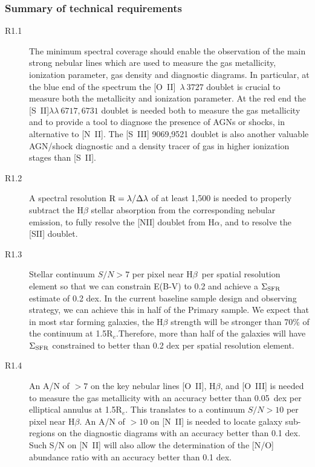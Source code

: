 \documentclass[preprint,11pt]{aastex}
\newcommand{\Hbeta}{{H$\beta$}}
\newcommand{\Reff}{{R$_{e}$}}
\begin{document}
\subsubsection{Summary of technical requirements}

\begin{description}

\item [R1.1] The minimum spectral coverage should enable the
  observation of the main strong nebular lines which are used to
  measure the gas metallicity, ionization parameter, gas density and
  diagnostic diagrams.  In particular, at the blue end of the spectrum
  the [O~II]~$\lambda~3727$ doublet is crucial to measure both the
  metallicity and ionization parameter.  At the red end the
  [S~II]$\lambda\lambda~6717,6731$ doublet is needed both to measure
  the gas metallicity and to provide a tool to diagnose the presence
  of AGNs or shocks, in alternative to [N~II]. The [S~III] 9069,9521
  doublet is also another valuable AGN/shock diagnostic
  \citep{osterbrock92} and a density tracer of gas in higher
  ionization stages than [S~II].

\item [R1.2] A spectral resolution $\rm R=\lambda/\Delta \lambda$ of
  at least 1,500 is needed to properly subtract the H$\beta$ stellar
  absorption from the corresponding nebular emission, to fully resolve
  the [NII] doublet from H$\alpha$, and to resolve the [SII] doublet.

\item [R1.3] Stellar continuum $S/N > 7$ per pixel near \Hbeta\ per
  spatial resolution element so that we can constrain E(B-V) to 0.2
  and achieve a ${\rm \Sigma_{SFR}}$ estimate of 0.2 dex. In the
  current baseline sample design and observing strategy, we can
  achieve this in half of the Primary sample. We expect that in most
  star forming galaxies, the H$\beta$ strength will be stronger than
  70\% of the continuum at 1.5\Reff.Therefore, more than half of the
  galaxies will have ${\rm \Sigma_{SFR}}$ constrained to better than
  0.2 dex per spatial resolution element.

\item [R1.4] An A/N of $>7$ on the key nebular lines [O~II], H$\beta$, and
  [O~III] is needed to measure the gas metallicity with an accuracy
  better than 0.05~dex per elliptical annulus at 1.5\Reff. This translates
  to a continuum $S/N > 10$ per pixel near \Hbeta.
  An A/N of $>10$ on [N~II] is needed to locate galaxy sub-regions on the
  diagnostic diagrams with an accuracy better than 0.1 dex. Such S/N
  on [N~II] will also allow the determination of the [N/O] abundance
  ratio with an accuracy better than 0.1 dex.  %


\end{description}
\end{document}

